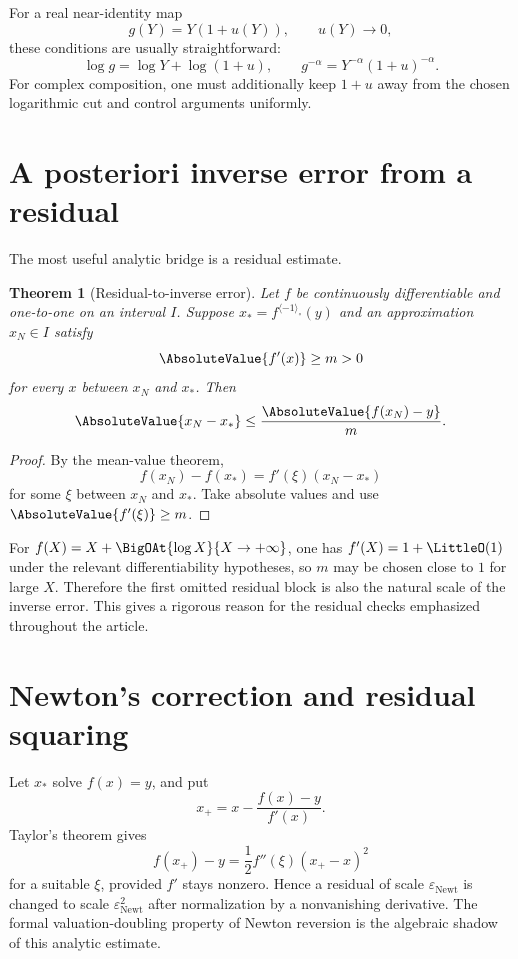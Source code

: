 \documentclass[11pt,oneside]{book}
\newtheorem{theorem}{Theorem}[chapter]
\theoremstyle{definition}
\theoremstyle{remark}
\newcommand{\compinv}{^{\langle-1\rangle_{\circ}}}
\newcommand{\NewtonResidualScale}{\varepsilon_{\mathrm{Newt}}}
\begin{document}
For a real near-identity map
\[
 g(Y)=Y(1+u(Y)),\qquad u(Y)\to0,
\]
these conditions are usually straightforward:
\[
 \log g=\log Y+\log(1+u),\qquad
 g^{-\alpha}=Y^{-\alpha}(1+u)^{-\alpha}.
\]
For complex composition, one must additionally keep $1+u$ away from the
chosen logarithmic cut and control arguments uniformly.

\section{A posteriori inverse error from a residual}
The most useful analytic bridge is a residual estimate.

\begin{theorem}[Residual-to-inverse error]\label{thm:residual-inverse}
Let $f$ be continuously differentiable and one-to-one on an interval $I$.
Suppose $x_\ast=f\compinv(y)$ and an approximation $x_N\in I$ satisfy
\[
 \AbsoluteValue{f'(x)}\ge m>0
\]
for every $x$ between $x_N$ and $x_\ast$. Then
\begin{equation}\label{eq:residual-error}
 \AbsoluteValue{x_N-x_\ast}
 \le \frac{\AbsoluteValue{f(x_N)-y}}{m}.
\end{equation}
\end{theorem}

\begin{proof}
By the mean-value theorem,
\[
 f(x_N)-f(x_\ast)=f'(\xi)(x_N-x_\ast)
\]
for some $\xi$ between $x_N$ and $x_\ast$. Take absolute values and use
$\AbsoluteValue{f'(\xi)}\ge m$.
\end{proof}

For $f(X)=X+\BigOAt{\log X}{X\to+\infty}$, one has
$f'(X)=1+\LittleO(1)$ under the relevant
differentiability hypotheses, so $m$ may be chosen close to $1$ for large
$X$. Therefore the first omitted residual block is also the natural scale
of the inverse error. This gives a rigorous reason for the residual checks
emphasized throughout the article.

\section{Newton's correction and residual squaring}
Let $x_\ast$ solve $f(x)=y$, and put
\[
 x_+=x-\frac{f(x)-y}{f'(x)}.
\]
Taylor's theorem gives
\[
 f(x_+)-y
 =\frac12f''(\xi)(x_+-x)^2
\]
for a suitable $\xi$, provided $f'$ stays nonzero. Hence a residual of
scale $\NewtonResidualScale$ is changed to scale
$\NewtonResidualScale^2$ after normalization
by a nonvanishing derivative. The formal valuation-doubling property of
Newton reversion is the algebraic shadow of this analytic estimate.
\end{document}

